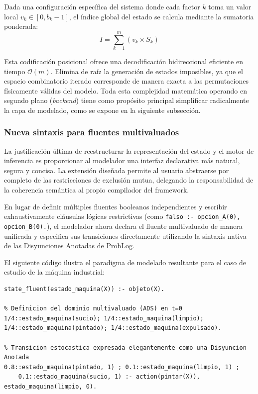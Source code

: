 Dada una configuración específica del sistema donde cada factor $k$ toma un valor local $v_k \in [0, b_k - 1]$, el índice global del estado se calcula mediante la sumatoria ponderada:
\begin{equation}
    I = \sum_{k=1}^{m} (v_k \times S_k)
\end{equation}

Esta codificación posicional ofrece una decodificación bidireccional eficiente en tiempo $\mathcal{O}(m)$. Elimina de raíz la generación de estados imposibles, ya que el espacio combinatorio iterado corresponde de manera exacta a las permutaciones físicamente válidas del modelo. Toda esta complejidad matemática operando en segundo plano (\textit{backend}) tiene como propósito principal simplificar radicalmente la capa de modelado, como se expone en la siguiente subsección.

\subsubsection{Nueva sintaxis para fluentes multivaluados}
\label{sec:di-nueva-sintaxis}

La justificación última de reestructurar la representación del estado y el motor de inferencia es proporcionar al modelador una interfaz declarativa más natural, segura y concisa. La extensión diseñada permite al usuario abstraerse por completo de las restricciones de exclusión mutua, delegando la responsabilidad de la coherencia semántica al propio compilador del framework.

En lugar de definir múltiples fluentes booleanos independientes y escribir exhaustivamente cláusulas lógicas restrictivas (como \texttt{falso :- opcion\_A(0), opcion\_B(0).}), el modelador ahora declara el fluente multivaluado de manera unificada y especifica sus transiciones directamente utilizando la sintaxis nativa de las Disyunciones Anotadas de ProbLog.

El siguiente código ilustra el paradigma de modelado resultante para el caso de estudio de la máquina industrial:

\begin{lstlisting}[caption={Declaración y transición de un fluente multivaluado bajo la nueva sintaxis.}, label={lst:nueva_sintaxis}]
% Declaracion unificada del fluente de estado
state_fluent(estado_maquina(X)) :- objeto(X).

% Definicion del dominio multivaluado (ADS) en t=0
1/4::estado_maquina(sucio); 1/4::estado_maquina(limpio);
1/4::estado_maquina(pintado); 1/4::estado_maquina(expulsado).

% Transicion estocastica expresada elegantemente como una Disyuncion Anotada
0.8::estado_maquina(pintado, 1) ; 0.1::estado_maquina(limpio, 1) ;
    0.1::estado_maquina(sucio, 1) :- action(pintar(X)), estado_maquina(limpio, 0).
\end{lstlisting}

